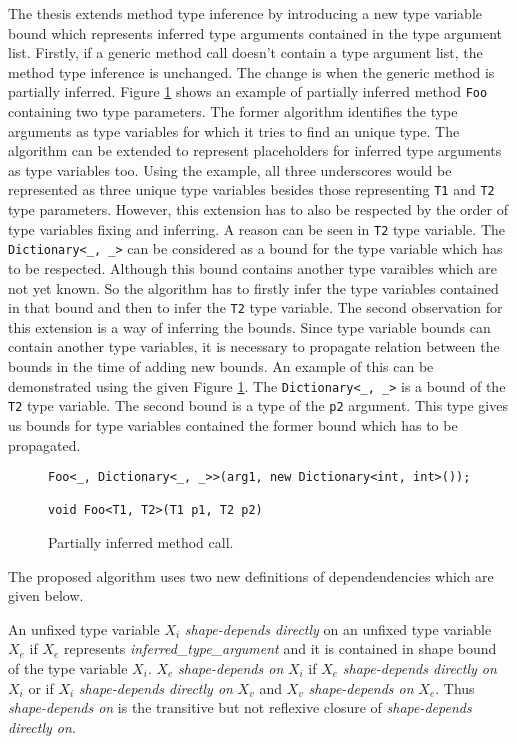 The thesis extends method type inference by introducing a new type variable bound which represents inferred type arguments contained in the type argument list.
Firstly, if a generic method call doesn't contain a type argument list, the method type inference is unchanged.
The change is when the generic method is partially inferred.
Figure \ref{img54:partInf} shows an example of partially inferred method \texttt{Foo} containing two type parameters.
The former algorithm identifies the type arguments as type variables for which it tries to find an unique type.
The algorithm can be extended to represent placeholders for inferred type arguments as type variables too.
Using the example, all three underscores would be represented as three unique type variables besides those representing \texttt{T1} and \texttt{T2} type parameters.
However, this extension has to also be respected by the order of type variables fixing and inferring.
A reason can be seen in \texttt{T2} type variable.
The \texttt{Dictionary<\_, \_>} can be considered as a bound for the type variable which has to be respected.
Although this bound contains another type varaibles which are not yet known.
So the algorithm has to firstly infer the type variables contained in that bound and then to infer the \texttt{T2} type variable.
The second observation for this extension is a way of inferring the bounds.
Since type variable bounds can contain another type variables, it is necessary to propagate relation between the bounds in the time of adding new bounds.
An example of this can be demonstrated using the given Figure \ref{img54:partInf}.
The \texttt{Dictionary<\_, \_>} is a bound of the \texttt{T2} type variable.
The second bound is a type of the \texttt{p2} argument.
This type gives us bounds for type variables contained the former bound which has to be propagated.
\begin{figure}[h!]
\begin{lstlisting}[style=csharp]
Foo<_, Dictionary<_, _>>(arg1, new Dictionary<int, int>());

void Foo<T1, T2>(T1 p1, T2 p2)
\end{lstlisting}
\caption{Partially inferred method call.}
\label{img54:partInf}
\end{figure}
\par
The proposed algorithm uses two new definitions of dependendencies which are given below.
\begin{defn}
An unfixed type variable \texttt{$X_i$} \emph{shape-depends directly} on an unfixed type variable \texttt{$X_e$} if \texttt{$X_e$} represents \textit{inferred\_type\_argument} and it is contained in shape bound of the type variable \texttt{$X_i$}.
\texttt{$X_e$} \textit{shape-depends on} \texttt{$X_i$} if \texttt{$X_e$} \textit{shape-depends directly on} \texttt{$X_i$} or if \texttt{$X_i$} \textit{shape-depends directly on} \texttt{$X_v$} and \texttt{$X_v$} \textit{shape-depends on} \texttt{$X_e$}. Thus \textit{shape-depends on} is the transitive but not reflexive closure of \textit{shape-depends directly on}.
\end{defn}
